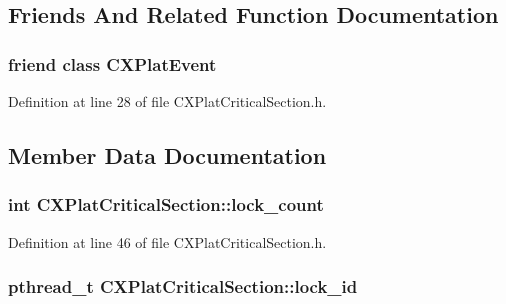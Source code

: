 \subsection{\-Friends \-And \-Related \-Function \-Documentation}
\hypertarget{class_c_x_plat_critical_section_a07b9fb7f9e1f7c3e3f6604a7cc379be1}{
\subsubsection[{\-C\-X\-Plat\-Event}]{\setlength{\rightskip}{0pt plus 5cm}friend class {\bf \-C\-X\-Plat\-Event}}}\label{class_c_x_plat_critical_section_a07b9fb7f9e1f7c3e3f6604a7cc379be1}


\-Definition at line 28 of file \-C\-X\-Plat\-Critical\-Section.\-h.



\subsection{\-Member \-Data \-Documentation}
\hypertarget{class_c_x_plat_critical_section_a0bc1b3ef29deaac5438dd6ab245c0b9d}{
\subsubsection[{lock\-\_\-count}]{\setlength{\rightskip}{0pt plus 5cm}int {\bf \-C\-X\-Plat\-Critical\-Section\-::lock\-\_\-count}}}\label{class_c_x_plat_critical_section_a0bc1b3ef29deaac5438dd6ab245c0b9d}


\-Definition at line 46 of file \-C\-X\-Plat\-Critical\-Section.\-h.

\hypertarget{class_c_x_plat_critical_section_a90276ecb4828f7c51166fc6588e31d22}{
\subsubsection[{lock\-\_\-id}]{\setlength{\rightskip}{0pt plus 5cm}pthread\-\_\-t {\bf \-C\-X\-Plat\-Critical\-Section\-::lock\-\_\-id}}}\label{class_c_x_plat_critical_section_a90276ecb4828f7c51166fc6588e31d22}


